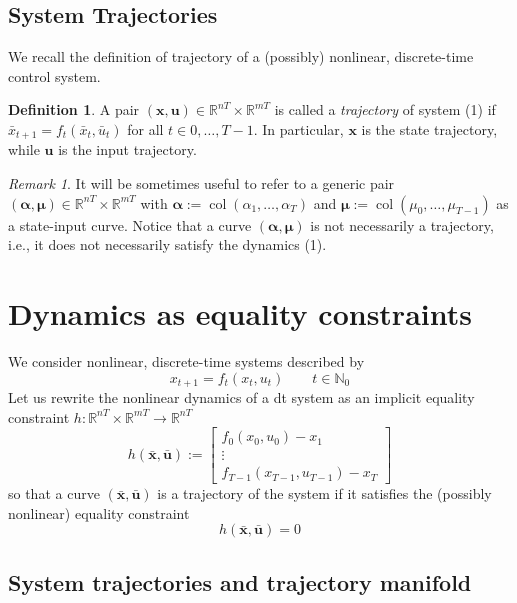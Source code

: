 \documentclass[openany]{book}
\DeclareMathOperator{\col}{col}            %
\newcommand{\R}{\mathbb{R}}                %
\newcommand{\N}{\mathbb{N}}                %
\newcommand{\traj}{(\bar{\mathbf{x}},\bar{\mathbf{u}})}    %
\theoremstyle{definition}
\newtheorem{definition}{Definition}[section]
\theoremstyle{remark}
\newtheorem*{remark}{Remark}
\begin{document}
\subsection{System Trajectories}
We recall the definition of trajectory of a (possibly) nonlinear, discrete-time control system.

\begin{definition}
A pair $(\mathbf{x}, \mathbf{u}) \in \R^{nT} \times \R^{mT}$ is called a \emph{trajectory} of system (1) if $\bar{x}_{t+1} = f_t(\bar{x}_t, \bar{u}_t)$ for all $t \in 0,\ldots,T-1$. In particular, $\mathbf{x}$ is the state trajectory, while $\mathbf{u}$ is the input trajectory.
\end{definition}

\begin{remark}
It will be sometimes useful to refer to a generic pair $(\boldsymbol{\alpha}, \boldsymbol{\mu}) \in \R^{nT} \times \R^{mT}$ with $\boldsymbol{\alpha} := \col(\alpha_1,\ldots,\alpha_T)$ and $\boldsymbol{\mu} := \col(\mu_0,\ldots,\mu_{T-1})$ as a state-input curve. Notice that a curve $(\boldsymbol{\alpha}, \boldsymbol{\mu})$ is not necessarily a trajectory, i.e., it does not necessarily satisfy the dynamics (1).
\end{remark}

\section{Dynamics as equality constraints}
We consider nonlinear, discrete-time systems described by 
\begin{equation} \label{system2}
    x_{t+1} = f_t(x_t,u_t) \qquad t\in\N_0
\end{equation}
Let us rewrite the nonlinear dynamics of a dt system as an implicit equality constraint $h:\R^{nT}\times \R^{mT}\to\R^{nT}$ 
\[
    h\traj:=\begin{bmatrix}
        f_0(x_0,u_0)-x_1 \\ \vdots \\ f_{T-1}(x_{T-1},u_{T-1})-x_T
    \end{bmatrix}
\]
so that a curve $\traj$ is a trajectory of the system if it satisfies the (possibly nonlinear) equality constraint 
\[
    h\traj = 0
\]

\subsection{System trajectories and trajectory manifold}
\end{document}
